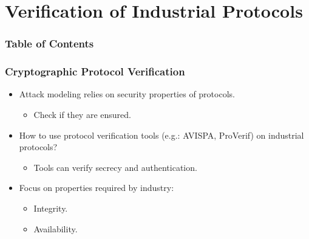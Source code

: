 \documentclass{beamer}
\begin{document}
%

\section{Verification of Industrial Protocols}

\begin{frame}
    \frametitle{Table of Contents}
    
    \tableofcontents[currentsection]
\end{frame}

\begin{frame}
    \frametitle{Cryptographic Protocol Verification}

    \begin{itemize}
        \item Attack modeling relies on security properties of protocols.
        \begin{itemize}
            \item Check if they are ensured.
        \end{itemize}
            \vfill
        \item How to use protocol verification tools (e.g.: AVISPA\cite{AVISPA06_manual}, ProVerif\cite{Bla01}) on industrial protocols?
        \begin{itemize}
            \item Tools can verify secrecy and authentication.
        \end{itemize}
            \vfill
        \item Focus on properties required by industry:
        \begin{itemize}
            \item Integrity.
            \item Availability.
        \end{itemize}
    \end{itemize}
\end{frame}
\end{document}
